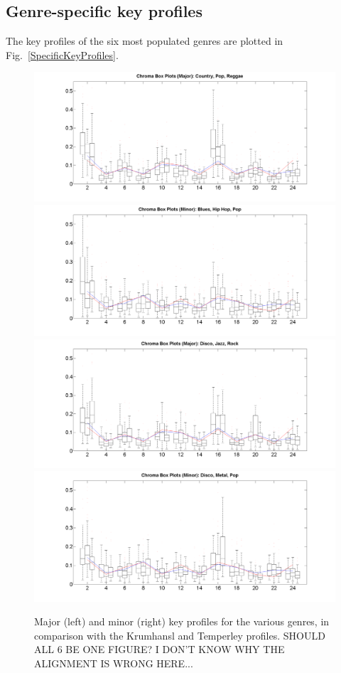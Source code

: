 \documentclass{article}
\begin{document}
\subsection{Genre-specific key profiles}
The key profiles of the six most populated genres are plotted in Fig.~\ref{SpecificKeyProfiles}.
\begin{figure}[tb]
    \includegraphics[scale=.2]{graph/boxPlotsMajCPR+Krum+Temp}
    \includegraphics[scale=.2]{graph/boxPlotsMinBHP+Krum+Temp}
    \includegraphics[scale=.2]{graph/boxPlotsMajDJRk+Krum+Temp}
    \includegraphics[scale=.2]{graph/boxPlotsMinDMR+Krum+Temp}
	\caption{Major (left) and minor (right) key profiles for the various genres, in comparison with the Krumhansl and Temperley profiles. SHOULD ALL 6 BE ONE FIGURE? I DON'T KNOW WHY THE ALIGNMENT IS WRONG HERE...}
	\label{fig:SpecificKeyProfiles}
\end{figure}
\end{document}
